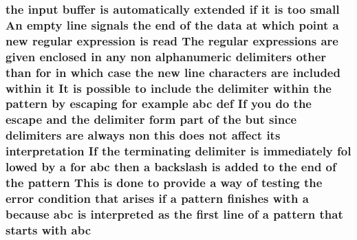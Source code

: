 \subsubsection[{\texorpdfstring{abc}{abc}}]{\setlength{\rightskip}{0pt plus 5cm}the {\bf input} {\bf buffer} {\bf is} automatically extended {\bf if} {\bf it} {\bf is} too small An {\bf empty} {\bf line} signals the {\bf end} {\bf of} the {\bf data} at {\bf which} {\bf point} {\bf a} new regular {\bf expression} {\bf is} {\bf read} The regular {\bf expressions} {\bf are} {\bf given} enclosed {\bf in} {\bf any} non {\bf alphanumeric} delimiters other {\bf than} for {\bf in} {\bf which} {\bf case} the new {\bf line} {\bf characters} {\bf are} {\bf included} within {\bf it} It {\bf is} {\bf possible} {\bf to} {\bf include} the delimiter within the {\bf pattern} by escaping for {\bf example} abc def If you {\bf do} the escape and the delimiter form part {\bf of} the but since delimiters {\bf are} always non {\bf this} does {\bf not} affect its interpretation If the terminating delimiter {\bf is} immediately fol lowed by {\bf a} for abc then {\bf a} {\bf backslash} {\bf is} added {\bf to} the {\bf end} {\bf of} the {\bf pattern} This {\bf is} {\bf done} {\bf to} provide {\bf a} {\bf way} {\bf of} testing the {\bf error} condition that {\bf arises} {\bf if} {\bf a} {\bf pattern} finishes {\bf with} {\bf a} because abc {\bf is} interpreted {\bf as} the {\bf first} {\bf line} {\bf of} {\bf a} {\bf pattern} that starts {\bf with} abc}\hypertarget{pcretest_8txt_acd19f8707402317c50c99e06971d4976}{}\label{pcretest_8txt_acd19f8707402317c50c99e06971d4976}
